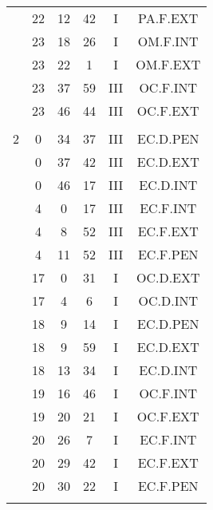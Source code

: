 \documentclass[12pt, a4paper]{article}
\begin{document}
\begin{multicols}{3}
{\begin{tabular}{c c c c c c}
	 	 	 	 & 22 & 12 & 42 & I & PA.F.EXT\\%
	 	 	 	 & 23 & 18 & 26 & I & OM.F.INT\\%
	 	 	 	 & 23 & 22 & 1 & I & OM.F.EXT\\%
	 	 	 	 & 23 & 37 & 59 & III & OC.F.INT\\%
	 	 	 	 & 23 & 46 & 44 & III & OC.F.EXT\\%
	 	 	 	 & & & & & \\%
	 	 	 	2 & 0 & 34 & 37 & III & EC.D.PEN\\%
	 	 	 	 & 0 & 37 & 42 & III & EC.D.EXT\\%
	 	 	 	 & 0 & 46 & 17 & III & EC.D.INT\\%
	 	 	 	 & 4 & 0 & 17 & III & EC.F.INT\\%
	 	 	 	 & 4 & 8 & 52 & III & EC.F.EXT\\%
	 	 	 	 & 4 & 11 & 52 & III & EC.F.PEN\\%
	 	 	 	 & 17 & 0 & 31 & I & OC.D.EXT\\%
	 	 	 	 & 17 & 4 & 6 & I & OC.D.INT\\%
	 	 	 	 & 18 & 9 & 14 & I & EC.D.PEN\\%
	 	 	 	 & 18 & 9 & 59 & I & EC.D.EXT\\%
	 	 	 	 & 18 & 13 & 34 & I & EC.D.INT\\%
	 	 	 	 & 19 & 16 & 46 & I & OC.F.INT\\%
	 	 	 	 & 19 & 20 & 21 & I & OC.F.EXT\\%
	 	 	 	 & 20 & 26 & 7 & I & EC.F.INT\\%
	 	 	 	 & 20 & 29 & 42 & I & EC.F.EXT\\%
	 	 	 	 & 20 & 30 & 22 & I & EC.F.PEN\\%
	 	 	 	 & & & & & \\%

\end{tabular}}
\end{multicols}
\end{document}
